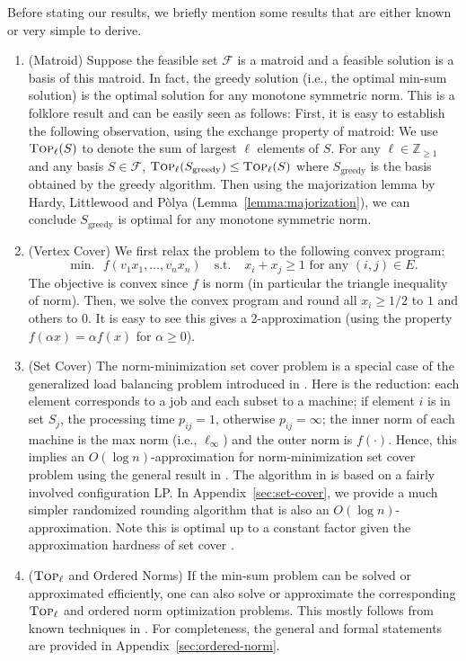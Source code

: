 \documentclass[11pt,a4paper]{article} \usepackage{enumitem}
\newcommand{\calF}{\mathcal{F}}
\newcommand{\topp}[1]{\textsc{Top}_{#1}}
\theoremstyle{definition}
\begin{document}
Before stating our results, we briefly mention some results that are either known or very simple to derive. 
\begin{enumerate}
    \item (Matroid) Suppose the feasible set $\calF$ is a matroid
    and a feasible solution is a basis of this matroid.
    In fact, the greedy solution (i.e., the optimal min-sum solution)
    is the optimal solution for any monotone symmetric norm.
    This is a folklore result and can be easily seen as follows:
    First, it is easy to establish
    the following observation, using the exchange property of matroid: 
    We use $\topp{\ell}(S)$ to denote the sum of largest $\ell$ elements of 
    $S$. For any $\ell\in \mathbb{Z}_{\geq 1}$ and 
    any basis $S\in \calF$,
    $\topp{\ell}(S_{\text{greedy}})\leq \topp{\ell}(S)$
    where $S_{\text{greedy}}$ is the basis obtained by the greedy algorithm.
    Then using the majorization lemma by Hardy, Littlewood and P\`olya
    (Lemma~\ref{lemma:majorization}),
    we can conclude $S_{\text{greedy}}$ is optimal for any monotone symmetric norm.
    \item (Vertex Cover)
    We first relax the problem to the following convex program:
    $$\text{min.}\,\,\,\, f(v_1x_1,\ldots, v_nx_n) \quad\text{s.t. }\,\,\,\
    x_i+x_j\geq 1 \text{ for any }(i,j)\in E.$$
    The objective is convex since $f$ is norm (in particular the triangle inequality of norm). Then, we solve the convex program
    and round all $x_i\geq 1/2$ to $1$ and others to $0$. It is easy to see this gives a 2-approximation (using the property $f(\alpha x)=\alpha f(x)$ for $\alpha\geq 0$).
    \item (Set Cover) The norm-minimization set cover problem 
    is a special case of the generalized load balancing problem introduced in
    \cite{deng2022generalized}. Here is the reduction:
    each element corresponds to a job and each subset to a machine;
    if element $i$ is in set $S_j$, the processing time $p_{ij}=1$,
    otherwise $p_{ij}=\infty$; the inner norm of each machine is the max
    norm (i.e., $\ell_\infty$) and the outer norm is $f(\cdot)$.
    Hence, this implies an $O(\log n)$-approximation for norm-minimization set cover problem using the general result in \cite{deng2022generalized}. The algorithm in \cite{deng2022generalized} is based on a fairly involved configuration LP. In Appendix~\ref{sec:set-cover}, we provide a much simpler randomized rounding algorithm that is also 
    an $O(\log n)$-approximation. Note this is optimal up to a constant factor given the approximation hardness of set cover \cite{feige1998threshold,dinur2014analytical}.
    \item ($\topp{\ell}$ and Ordered Norms)
    If the min-sum problem can be solved or approximated efficiently, one can also solve or approximate the corresponding $\topp{\ell}$ and ordered norm optimization problems. This mostly follows from known techniques in \cite{byrka2018constant,chakrabarty2019approximation,maalouly2022exact}. 
    For completeness, the general and formal statements are provided in Appendix~\ref{sec:ordered-norm}.
\end{enumerate}
\end{document}
